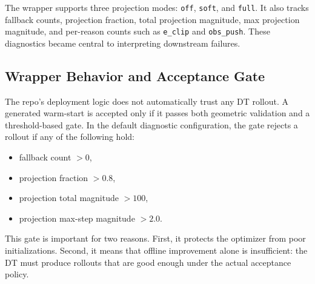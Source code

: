 The wrapper supports three projection modes:
\texttt{off}, \texttt{soft}, and \texttt{full}. It also tracks fallback counts, projection fraction, total projection magnitude, max projection magnitude, and per-reason counts such as \texttt{e\_clip} and \texttt{obs\_push}. These diagnostics became central to interpreting downstream failures.

\subsection{Wrapper Behavior and Acceptance Gate}

The repo's deployment logic does not automatically trust any DT rollout. A generated warm-start is accepted only if it passes both geometric validation and a threshold-based gate. In the default diagnostic configuration, the gate rejects a rollout if any of the following hold:
\begin{itemize}
\item fallback count $> 0$,
\item projection fraction $> 0.8$,
\item projection total magnitude $> 100$,
\item projection max-step magnitude $> 2.0$.
\end{itemize}

This gate is important for two reasons. First, it protects the optimizer from poor initializations. Second, it means that offline improvement alone is insufficient: the DT must produce rollouts that are good enough under the actual acceptance policy.
